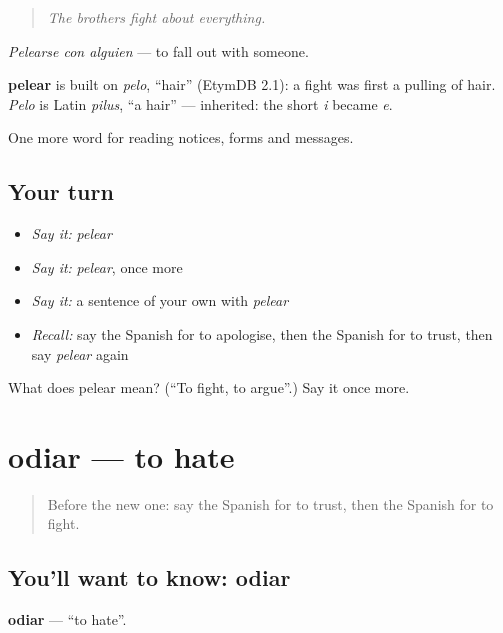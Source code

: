 \begin{quote}
\emph{The brothers fight about everything.}
\end{quote}

\emph{Pelearse con alguien} — to fall out with someone.

\begin{cousinweb}
\textbf{pelear} is built on \emph{pelo}, \textquotedblleft{}hair\textquotedblright{} (EtymDB 2.1): a fight was first a pulling of hair. \emph{Pelo} is Latin \emph{pilus}, \textquotedblleft{}a hair\textquotedblright{} — inherited: the short \emph{i} became \emph{e}.
\end{cousinweb}

\begin{grammarlens}[title={What you've built}]
One more word for reading notices, forms and messages.
\end{grammarlens}

\subsection*{Your turn}
\begin{itemize}
\raggedright
  \item \emph{Say it:} \emph{pelear}
  \item \emph{Say it:} \emph{pelear}, once more
  \item \emph{Say it:} a sentence of your own with \emph{pelear}
  \item \emph{Recall:} say the Spanish for to apologise, then the Spanish for to trust, then say \emph{pelear} again
\end{itemize}

\begin{tcolorbox}[breakable,colback=teal!4,colframe=teal!35!black,title={Before you move on}]
What does pelear mean? (\textquotedblleft{}To fight, to argue\textquotedblright{}.) Say it once more.
\end{tcolorbox}
\section[odiar]{odiar — to hate}

\label{lesson:ES-C510-odiar}



\begin{quote}
Before the new one: say the Spanish for to trust, then the Spanish for to fight.
\end{quote}

\subsection*{You'll want to know: odiar}
\textbf{odiar} — \textquotedblleft{}to hate\textquotedblright{}.

